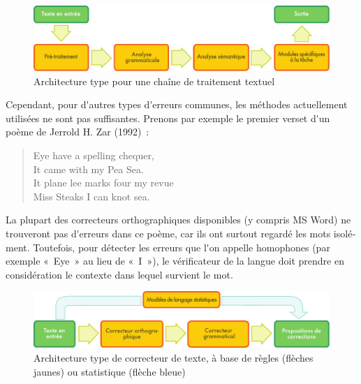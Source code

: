 \begin{french}
\begin{multicols}{2}
\begin{figure}[t]
\begin{center}
 \includegraphics[width=\textwidth]{../_media/french/text_processing_app_architecture}
\caption{Architecture type pour une chaîne de traitement textuel}
\label{fig:textprocarchi}
\end{center}
\end{figure}

Cependant, pour d{\mbox '}autres types d{\mbox '}erreurs communes, les
méthodes actuellement utilisées ne sont pas suffisantes. Prenons par
exemple le premier verset d{\mbox '}un poème de Jerrold H. Zar
(1992)~:\\
\begin{quote}
Eye have a spelling chequer,\\
It came with my Pea Sea.\\
It plane lee marks four my revue\\
Miss Steaks I can knot sea.\\
\end{quote}
La plupart des correcteurs orthographiques disponibles (y compris MS
Word) ne trouveront pas d{\mbox '}erreurs dans ce poème, car ils ont surtout
regardé les mots isolément. Toutefois, pour détecter les erreurs que
l{\mbox '}on appelle homophones (par exemple «~Eye~» au lieu de «~I~»), le
vérificateur de la langue doit prendre en considération le contexte
dans lequel survient le mot.

\begin{figure}[t]
\begin{center}
  \includegraphics[width=\textwidth]{../_media/french/language_checking.pdf}
\caption{Architecture type de correcteur de texte, à base de règles
  (flèches jaunes) ou statistique (flèche bleue)}
\label{fig:spellchecker}
\end{center}
\end{figure}


\end{multicols}
\end{french}
